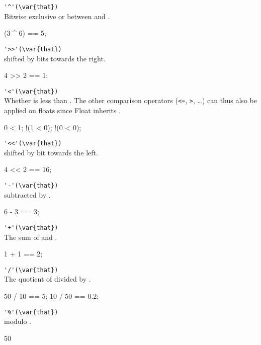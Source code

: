 \begin{urbiscriptapi}
\item \lstinline|'^'(\var{that})|\\
  Bitwise exclusive or between \this and .
\begin{urbiassert}
(3 ^ 6) == 5;
\end{urbiassert}

\item \lstinline|'>>'(\var{that})|\\%
  \this shifted by  bits towards the right.
\begin{urbiassert}
4 >> 2 == 1;
\end{urbiassert}

\item \lstinline|'<'(\var{that})|\\
  Whether \this is less than . The other comparison
  operators (\lstinline|<=|, \lstinline|>|, \ldots) can thus also be
  applied on floats since Float inherits .
\begin{urbiassert}
  0 < 1;
!(1 < 0);
!(0 < 0);
\end{urbiassert}

\item \lstinline|'<<'(\var{that})|\\
  \this shifted by  bit towards the left.
\begin{urbiassert}
4 << 2 == 16;
\end{urbiassert}

\item \lstinline|'-'(\var{that})|\\
  \this subtracted by .
\begin{urbiassert}
6 - 3 == 3;
\end{urbiassert}

\item \lstinline|'+'(\var{that})|\\
  The sum of \this and .
\begin{urbiassert}
1 + 1 == 2;
\end{urbiassert}

\item \lstinline|'/'(\var{that})|\\
  The quotient of \this divided by .
\begin{urbiassert}
50 / 10 == 5;
10 / 50 == 0.2;
\end{urbiassert}

\item \lstinline|'%'(\var{that})|\\
  \this modulo .
\begin{urbiassert}
50 %
\end{urbiassert}


\end{urbiscriptapi}
